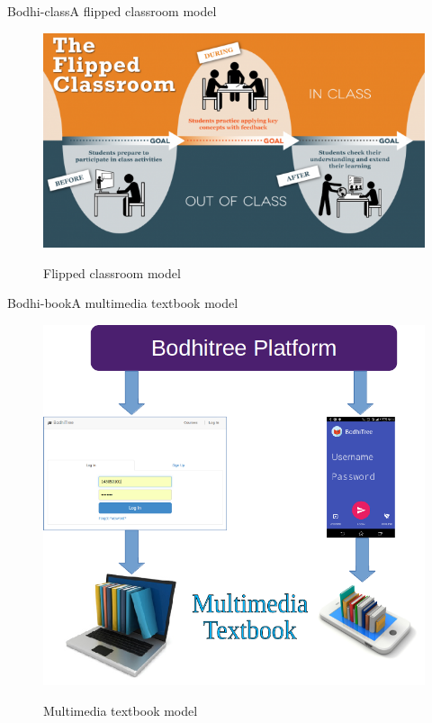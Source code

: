 \documentclass[xcolor=table]{beamer}
\begin{document}
\begin{frame}{Bodhi-class}{A flipped classroom model}
	\begin{figure}
	\centering
	\includegraphics[width=0.8\linewidth]{./media/flippedflowmodel}\\[-1ex]
	\caption{Flipped classroom model}
	\label{fig:btclass}
	\end{figure}
\end{frame}

\begin{frame}{Bodhi-book}{A multimedia textbook model}
	\begin{figure}
	\centering
	\includegraphics[width=0.5\linewidth]{./media/bmmt}\\[-1ex]
	\caption{Multimedia textbook model}
	\label{fig:btmmb}
	\end{figure}
\end{frame}

\end{document}
